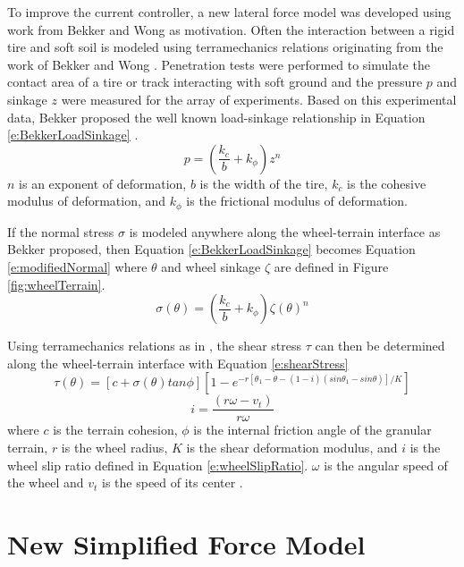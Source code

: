 \documentclass[12pt,onecolumn]{report}
\begin{document}
To improve the current controller, a new lateral force model was developed using work from Bekker and Wong as motivation. Often the interaction between a rigid tire and soft soil is modeled using terramechanics relations originating from the work of Bekker and Wong \cite{wong93}. Penetration tests were performed to simulate the contact area of a tire or track interacting with soft ground and the pressure $p$ and sinkage $z$ were measured for the array of experiments. Based on this experimental data, Bekker proposed the well known load-sinkage relationship in Equation \eqref{e:BekkerLoadSinkage} \cite{wong93}. 
%
\begin{equation}\label{e:BekkerLoadSinkage}
p = \left(\frac{k_c}{b} + k_\phi\right)z^n
\end{equation}
$n$ is an exponent of deformation, $b$ is the width of the tire, $k_c$ is the cohesive modulus of deformation, and $k_\phi$ is the frictional modulus of deformation.

If the normal stress $\sigma$ is modeled anywhere along the wheel-terrain interface as Bekker proposed, then Equation \eqref{e:BekkerLoadSinkage} becomes Equation \eqref{e:modifiedNormal} where $\theta$ and wheel sinkage $\zeta$ are defined in Figure \ref{fig:wheelTerrain}.
%
\begin{equation}\label{e:modifiedNormal}
\sigma\left(\theta\right) = \left(\frac{k_c}{b} + k_\phi\right)\zeta\left(\theta\right)^n
\end{equation}

Using terramechanics relations as in \cite{wong93}, the shear stress $\tau$ can then be determined along the wheel-terrain interface with Equation \eqref{e:shearStress}
%
\begin{equation}\label{e:shearStress}
\tau\left(\theta\right) = [c+\sigma\left(\theta\right)tan\phi][1 - e^{-r[\theta_1 - \theta - \left(1-i\right)\left(sin\theta_1 - sin\theta\right)]/K}]
\end{equation}
\begin{equation}\label{e:wheelSlipRatio}
i = \frac{\left(r\omega-v_t \right)}{r \omega}
\end{equation}
 where $c$ is the terrain cohesion, $\phi$ is the internal friction angle of the granular terrain, $r$ is the wheel radius, $K$ is the shear deformation modulus, and $i$ is the wheel slip ratio defined in Equation \eqref{e:wheelSlipRatio}. $\omega$ is the angular speed of the wheel and $v_t$ is the speed of its center \cite{Ghotbi2016}. 

\section{New Simplified Force Model}\label{s:NewForce}
\end{document}
